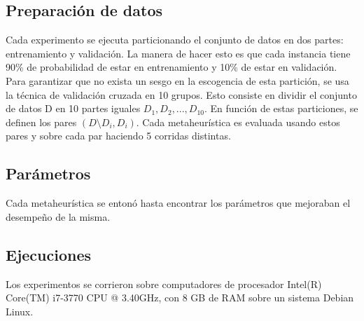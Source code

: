 \documentclass[11pt]{article}
\begin{document}
\subsection{Preparación de datos}

Cada experimento se ejecuta particionando el conjunto de datos en dos partes: entrenamiento y validación. La manera de hacer esto es que cada instancia tiene 90\% de probabilidad de estar en entrenamiento y 10\% de estar en validación. Para garantizar que no exista un sesgo en la escogencia de esta partición, se usa la técnica de validación cruzada en 10 grupos. Esto consiste en dividir el conjunto de datos D en 10 partes iguales $D_1, D_2, ..., D_{10}$. En función de estas particiones, se definen los pares $(D \setminus D_i, D_i)$. Cada metaheurística es evaluada usando estos pares y sobre cada par haciendo 5 corridas distintas.


\subsection{Parámetros}

Cada metaheurística se entonó hasta encontrar los parámetros que mejoraban el desempeño de la misma.

\begin{table}[h]
\caption{Parámetros usados en metaheurísticas}
\label{tabla:2}
\end{table}

\subsection{Ejecuciones}
Los experimentos se corrieron sobre computadores de procesador Intel(R) Core(TM) i7-3770 CPU @ 3.40GHz, con 8 GB de RAM sobre un sistema Debian Linux.
\end{document}
